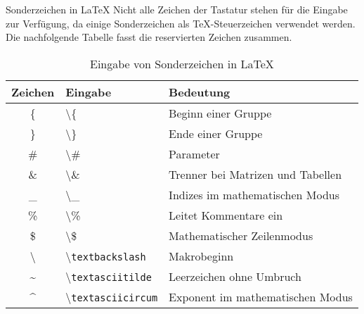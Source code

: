\begin{frame}{Sonderzeichen in \LaTeX}
Nicht alle Zeichen der Tastatur stehen für die Eingabe zur Verfügung, da einige Sonderzeichen als \TeX{}-Steuerzeichen verwendet werden. Die nachfolgende Tabelle fasst die reservierten Zeichen zusammen.
\begin{table}
\caption{Eingabe von Sonderzeichen in \LaTeX}
	\begin{tabular}{cll}
		\hline
		Zeichen & Eingabe & Bedeutung \\
		\hline
		\{ & \textbackslash\{ & Beginn einer Gruppe \\
		\} & \textbackslash\} & Ende einer Gruppe \\
		\# & \textbackslash\# & Parameter \\
		\& & \textbackslash\& & Trenner bei Matrizen und Tabellen \\
		\_ & \textbackslash\_ & Indizes im mathematischen Modus \\
		\% & \textbackslash\% & Leitet Kommentare ein \\
		\$ & \textbackslash\$ & Mathematischer Zeilenmodus \\
		\textbackslash & \textbackslash\texttt{textbackslash} & Makrobeginn \\
		\textasciitilde & \textbackslash\texttt{textasciitilde} & Leerzeichen ohne Umbruch \\
	    \textasciicircum & \textbackslash\texttt{textasciicircum} & Exponent im mathematischen Modus \\
		\hline
	\end{tabular}
\end{table}
\end{frame}

